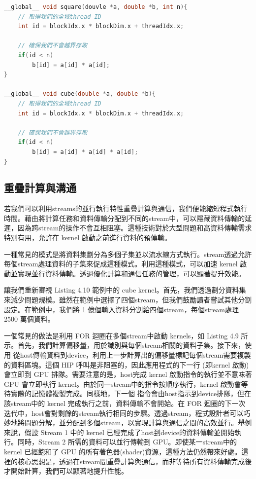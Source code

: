 \begin{lstlisting}[language=C, caption={cube和square的kernel程式碼}, label={10th:example}]
__global__ void square(douvle *a, double *b, int n){
    // 取得我們的全域thread ID
    int id = blockIdx.x * blockDim.x + threadIdx.x;

    // 確保我們不會越界存取
    if(id < n)
        b[id] = a[id] * a[id];
}

__global__ void cube(double *a, double *b){
    // 取得我們的全域thread ID
    int id = blockIdx.x * blockDim.x + threadIdx.x;

    // 確保我們不會越界存取
    if(id < n)
        b[id] = a[id] * a[id] * a[id];
}
\end{lstlisting}

\subsection{重疊計算與溝通}
若我們可以利用streams的並行執行特性重疊計算與通信，我們便能縮短程式執行時間。藉由將計算任務和資料傳輸分配到不同的stream中，可以隱藏資料傳輸的延遲，因為跨stream的操作不會互相阻塞。這種技術對於大型問題和高資料傳輸需求特別有用，允許在 kernel 啟動之前進行資料的預傳輸。

一種常見的模式是將資料集劃分為多個子集並以流水線方式執行。stream透過允許每個stream處理資料的子集來促成這種模式。利用這種模式，可以加速 kernel 啟動並實現並行資料傳輸。透過優化計算和通信任務的管理，可以顯著提升效能。

讓我們重新審視 Listing 4.10 範例中的 cube kernel。首先，我們透過劃分資料集來減少問題規模。雖然在範例中選擇了四個stream，但我們鼓勵讀者嘗試其他分割設定。在範例中，我們將 1 億個輸入資料分割給四個stream，每個stream處理 2500 萬個資料。

一個常見的做法是利用 FOR 迴圈在多個stream中啟動 kernels，如 Listing 4.9 所示。首先，我們計算偏移量，用於識別與每個stream相關的資料子集。接下來，使用  從host傳輸資料到device，利用上一步計算出的偏移量標記每個stream需要複製的資料區塊。這個 HIP 呼叫是非阻塞的，因此應用程式的下一行 (即kernel 啟動) 會立即到 GPU 排隊。需要注意的是，host完成 kernel 啟動指令的執行並不意味著 GPU 會立即執行 kernel。由於同一stream中的指令按順序執行，kernel 啟動會等待實際的記憶體複製完成。同樣地，下一個  指令會由host指示到device排隊，但在該stream中的 kernel 完成執行之前，資料傳輸不會開始。在 FOR 迴圈的下一次迭代中，host會對剩餘的stream執行相同的步驟。透過stream，程式設計者可以巧妙地將問題分解，並分配到多個stream，以實現計算與通信之間的高效並行。舉例來說，假設 Stream 1 中的 kernel 已經完成了host到device的資料傳輸並開始執行。同時，Stream 2 所需的資料可以並行傳輸到 GPU。即使某一stream中的 kernel 已經飽和了 GPU 的所有著色器(shader)資源，這種方法仍然帶來好處。這裡的核心思想是，透過在stream間重疊計算與通信，而非等待所有資料傳輸完成後才開始計算，我們可以顯著地提升性能。


